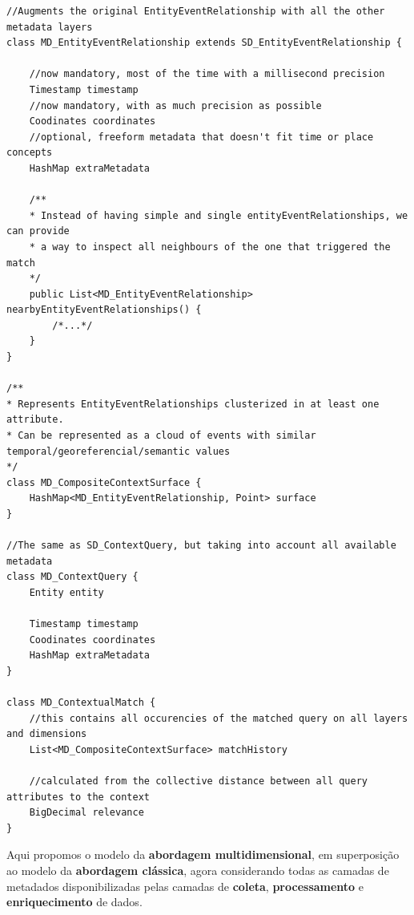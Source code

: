 \begin{verbatim}
//Augments the original EntityEventRelationship with all the other metadata layers
class MD_EntityEventRelationship extends SD_EntityEventRelationship {
    
    //now mandatory, most of the time with a millisecond precision
    Timestamp timestamp
    //now mandatory, with as much precision as possible
    Coodinates coordinates
    //optional, freeform metadata that doesn't fit time or place concepts
    HashMap extraMetadata

    /**
    * Instead of having simple and single entityEventRelationships, we can provide
    * a way to inspect all neighbours of the one that triggered the match
    */
    public List<MD_EntityEventRelationship> nearbyEntityEventRelationships() {
        /*...*/
    }
}

/**
* Represents EntityEventRelationships clusterized in at least one attribute.
* Can be represented as a cloud of events with similar temporal/georeferencial/semantic values
*/
class MD_CompositeContextSurface {
    HashMap<MD_EntityEventRelationship, Point> surface
}

//The same as SD_ContextQuery, but taking into account all available metadata
class MD_ContextQuery {
    Entity entity

    Timestamp timestamp
    Coodinates coordinates
    HashMap extraMetadata
}

class MD_ContextualMatch {
    //this contains all occurencies of the matched query on all layers and dimensions
    List<MD_CompositeContextSurface> matchHistory

    //calculated from the collective distance between all query attributes to the context
    BigDecimal relevance
}
\end{verbatim}

Aqui propomos o modelo da \textbf{abordagem multidimensional}, em superposição ao modelo da \textbf{abordagem clássica}, agora considerando todas as camadas de metadados disponibilizadas pelas camadas de \textbf{coleta}, \textbf{processamento} e \textbf{enriquecimento} de dados.
